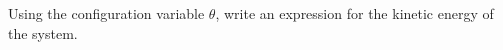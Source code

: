 
Using the configuration variable $\theta$, write an expression for the kinetic energy of the system.

